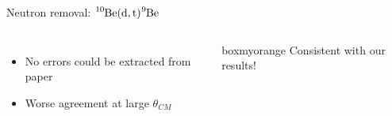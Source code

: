 \documentclass[sans,
frameno, %
mp,
usenames,dvipsnames, %
onlytextwidth, %
t,%
11pt]{beamer}
\newcommand{\iso}[2]{\ce{^{#1}#2}}
\begin{document}
\begin{frame}{Neutron removal: $\iso{10}{Be}(\textrm{d}, \textrm{t})\iso{9}{Be}$}
{\begin{figure}
\begin{minipage}[t]{0.48\linewidth}
\begin{tikzpicture}
                \end{tikzpicture}
            \end{minipage}
        \end{figure}
        \medskip
        \begin{columns}[c]
            {
                \begin{itemize}
                    \item No errors could be extracted from paper
                    \item Worse agreement at large $\theta_{CM}$
                \end{itemize}

            }
            \hfill
            {
                \begin{beamercolorbox}[sep=1ex, center, rounded=true]{boxmyorange}
                    Consistent with our results!
                \end{beamercolorbox}
            }
        \end{columns}
    }
\end{frame}
\end{document}
